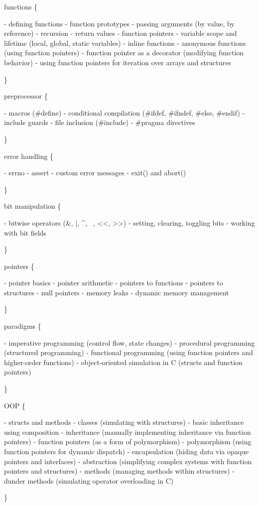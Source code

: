 functions \{ \begin{DoxyVerb}- defining functions
- function prototypes
- passing arguments (by value, by reference)
- recursion
- return values
- function pointers
- variable scope and lifetime (local, global, static variables)
- inline functions
- anonymous functions (using function pointers)
- function pointer as a decorator (modifying function behavior)
- using function pointers for iteration over arrays and structures
\end{DoxyVerb}
 \}

preprocessor \{ \begin{DoxyVerb}- macros (#define)
- conditional compilation (#ifdef, #ifndef, #else, #endif)
- include guards
- file inclusion (#include)
- #pragma directives
\end{DoxyVerb}
 \}

error handling \{ \begin{DoxyVerb}- errno
- assert
- custom error messages
- exit() and abort()
\end{DoxyVerb}
 \}

bit manipulation \{ \begin{DoxyVerb}- bitwise operators (&, |, ^, ~, <<, >>)
- setting, clearing, toggling bits
- working with bit fields
\end{DoxyVerb}
 \}

pointers \{ \begin{DoxyVerb}- pointer basics
- pointer arithmetic
- pointers to functions
- pointers to structures
- null pointers
- memory leaks
- dynamic memory management
\end{DoxyVerb}
 \}

paradigms \{ \begin{DoxyVerb}- imperative programming (control flow, state changes)
- procedural programming (structured programming)
- functional programming (using function pointers and higher-order functions)
- object-oriented simulation in C (structs and function pointers)
\end{DoxyVerb}
 \}

OOP \{ \begin{DoxyVerb}- structs and methods
- classes (simulating with structures)
- basic inheritance using composition
- inheritance (manually implementing inheritance via function pointers)
- function pointers (as a form of polymorphism)
- polymorphism (using function pointers for dynamic dispatch)
- encapsulation (hiding data via opaque pointers and interfaces)
- abstraction (simplifying complex systems with function pointers and structures)
- methods (managing methods within structures)
- dunder methods (simulating operator overloading in C)
\end{DoxyVerb}
 \}

